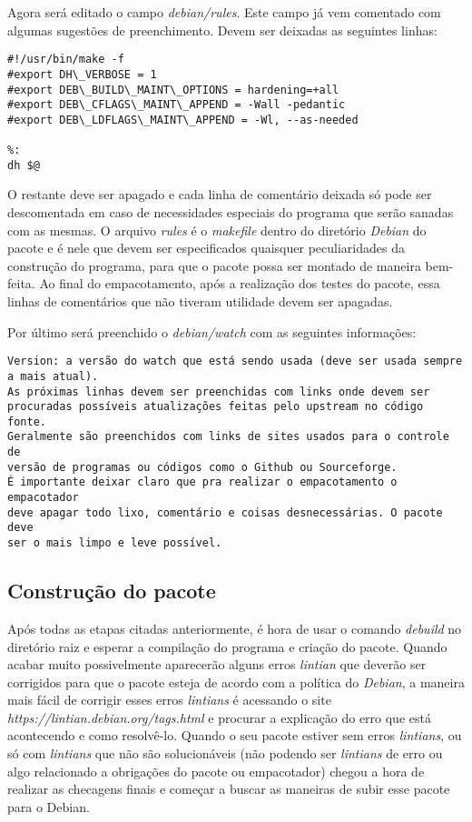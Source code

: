 Agora será editado o campo \textit{debian/rules}. Este campo já vem comentado com algumas sugestões de preenchimento. Devem ser deixadas as seguintes linhas:
\begin{verbatim}
#!/usr/bin/make -f
#export DH\_VERBOSE = 1
#export DEB\_BUILD\_MAINT\_OPTIONS = hardening=+all
#export DEB\_CFLAGS\_MAINT\_APPEND = -Wall -pedantic
#export DEB\_LDFLAGS\_MAINT\_APPEND = -Wl, --as-needed

%:
dh $@

\end{verbatim}
O restante deve ser apagado e cada linha de comentário deixada só pode ser descomentada em caso de necessidades especiais do programa que serão sanadas com as mesmas. O arquivo \textit{rules} é o \textit{makefile} dentro do diretório \textit{Debian} do pacote e é nele que devem ser especificados quaisquer peculiaridades da construção do programa, para que o pacote possa ser montado de maneira bem-feita. Ao final do empacotamento, após a realização dos testes do pacote, essa linhas de comentários que não tiveram utilidade devem ser apagadas.

Por último será preenchido o \textit{debian/watch} com as seguintes informações:
\begin{verbatim}
Version: a versão do watch que está sendo usada (deve ser usada sempre
a mais atual).
As próximas linhas devem ser preenchidas com links onde devem ser 
procuradas possíveis atualizações feitas pelo upstream no código fonte.
Geralmente são preenchidos com links de sites usados para o controle de 
versão de programas ou códigos como o Github ou Sourceforge.
É importante deixar claro que pra realizar o empacotamento o empacotador
deve apagar todo lixo, comentário e coisas desnecessárias. O pacote deve
ser o mais limpo e leve possível.
\end{verbatim}

\subsection{Construção do pacote}

Após todas as etapas citadas anteriormente, é hora de usar o comando \textit{debuild} no diretório raiz e esperar a compilação do programa e criação do pacote. Quando acabar muito possivelmente aparecerão alguns erros \textit{lintian} que deverão ser corrigidos para que o pacote esteja de acordo com a política do \textit{Debian}, a maneira mais fácil de corrigir esses erros \textit{lintians} é acessando o site \textit{https://lintian.debian.org/tags.html} e procurar a explicação do erro que está acontecendo e como resolvê-lo. Quando o seu pacote estiver sem erros \textit{lintians}, ou só com \textit{lintians} que não são solucionáveis (não podendo ser \textit{lintians} de erro ou algo relacionado a obrigações do pacote ou empacotador) chegou a hora de realizar as checagens finais e começar a buscar as maneiras de subir esse pacote para o Debian.

